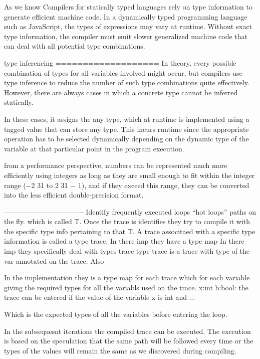 As we know Compilers for statically typed languages rely on type information to generate
efficient machine code. In a dynamically typed programming language such as
JavaScript, the types of expressions may vary at runtime. 
Without exact type information, the compiler
must emit slower generalized machine code that can deal with all potential type
combinations. 

type inferencing
===================
In theory, every
possible combination of types for all variables involved might occur, but compilers use type
inference to reduce the number of such type combinations quite effectively. However, there
are always cases in which a concrete type cannot be inferred statically.

In these cases, it assigns the any type, which at runtime is implemented 
using a tagged value that can store
any type. This incurs
runtime since the appropriate operation has to be selected dynamically depending on the
dynamic type of the variable at that particular point in the program execution. 

from a performance perspective, numbers can be represented much more efficiently using integers
as long as they are small enough to fit within the integer range (−2 31 to 2 31 − 1), and if they
exceed this range, they can be converted into the less efficient double-precision format.




----------------------------------
Identify frequently executed loops ``hot loops'' paths on the fly.
which is called T.
Once the trace is identifies they try to compile it with the specific
type info pertaining to that T.
A trace associtaed with a specific type information 
is called a type trace. In there imp they have a type map
In there imp they specifically deal with types trace
type trace is a trace with type of the var annotated on the trace.
Also

In the implementation they is a type map for each trace
which for each variable giving the required types for all the variabls used on the trace.
x:int b:bool: the trace can be entered if the value of the variable
x is int and ...

Which is the expected types of all the variables  before entering the loop.

In the subsequesnt iterations the compiled trace can be executed. The
execution is based on the speculation that the same path will be followed
every time or the types of the values will remain the same as we discovered
during compiling.

